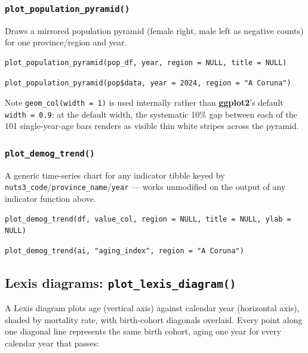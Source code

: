 \documentclass[11pt]{article}
\newcommand{\pkg}[1]{\textbf{#1}}
\newcommand{\fn}[1]{\texttt{#1}}
\begin{document}
\subsubsection{\fn{plot\_population\_pyramid()}}

Draws a mirrored population pyramid (female right, male left as negative
counts) for one province/region and year.

\begin{lstlisting}
plot_population_pyramid(pop_df, year, region = NULL, title = NULL)
\end{lstlisting}

\begin{lstlisting}
plot_population_pyramid(pop$data, year = 2024, region = "A Coruna")
\end{lstlisting}

Note \fn{geom\_col(width = 1)} is used internally rather than
\pkg{ggplot2}'s default \fn{width = 0.9}: at the default width, the
systematic 10\% gap between each of the 101 single-year-age bars renders as
visible thin white stripes across the pyramid.

\subsubsection{\fn{plot\_demog\_trend()}}

A generic time-series chart for any indicator tibble keyed by
\fn{nuts3\_code}/\fn{province\_name}/\fn{year} --- works unmodified on the
output of any indicator function above.

\begin{lstlisting}
plot_demog_trend(df, value_col, region = NULL, title = NULL, ylab = NULL)
\end{lstlisting}

\begin{lstlisting}
plot_demog_trend(ai, "aging_index", region = "A Coruna")
\end{lstlisting}

\subsection{Lexis diagrams: \fn{plot\_lexis\_diagram()}}

A Lexis diagram plots age (vertical axis) against calendar year (horizontal
axis), shaded by mortality rate, with birth-cohort diagonals overlaid. Every
point along one diagonal line represents the same birth cohort, aging one
year for every calendar year that passes:
\end{document}
